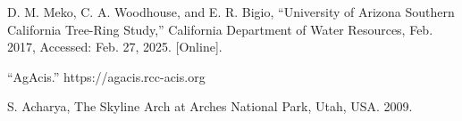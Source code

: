 \documentclass[]{article}
\begin{document}
\begin{thebibliography}{9}
	D. M. Meko, C. A. Woodhouse, and E. R. Bigio, “University of Arizona
	Southern California Tree-Ring Study,” California Department of Water Resources, Feb. 2017, Accessed: Feb. 27, 2025. [Online].
	
	“AgAcis.” https://agacis.rcc-acis.org
	
	S. Acharya, The Skyline Arch at Arches National Park, Utah, USA. 2009.
\end{thebibliography}
\end{document}
